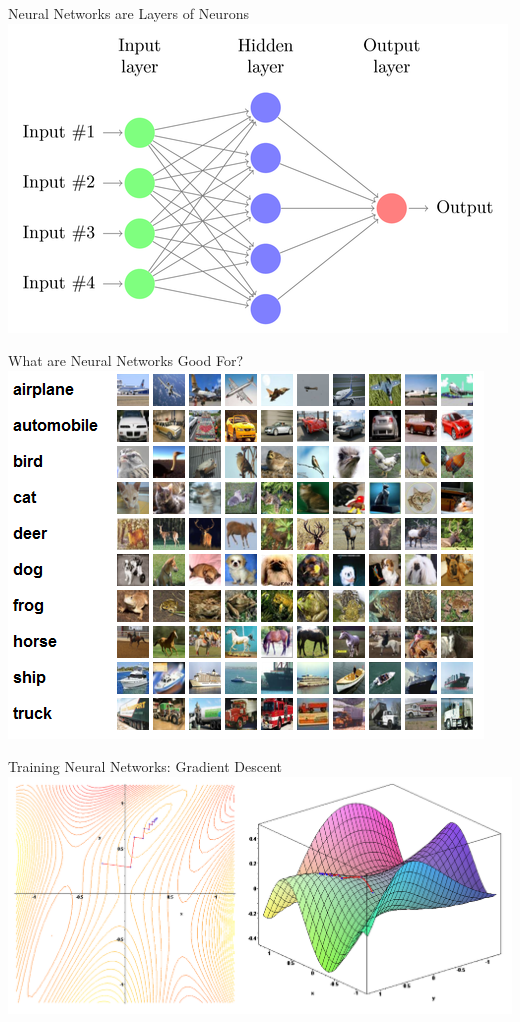 \documentclass{beamer}
\begin{document}
\begin{frame}{Neural Networks are Layers of Neurons}
    \includegraphics[scale=0.6]{neural-network.png}
\end{frame}

\begin{frame}{What are Neural Networks Good For?}
    \includegraphics[scale=0.7]{cifar_preview.png}
\end{frame}

\begin{frame}{Training Neural Networks: Gradient Descent}
\includegraphics[scale=0.4]{gradient.png}
\end{frame}
\end{document}
